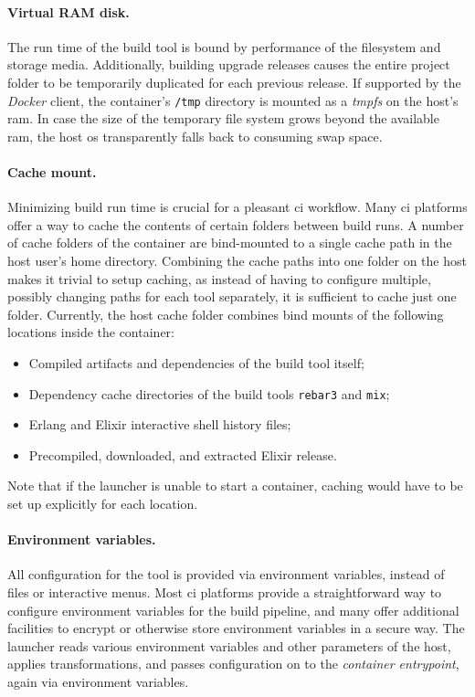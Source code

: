 \paragraph{Virtual RAM disk.} The run time of the build tool is bound by performance of the filesystem and storage media. Additionally, building upgrade releases causes the entire project folder to be temporarily duplicated for each previous release.
If supported by the \emph{Docker} client, the container's \lstinline|/tmp| directory is mounted as a \emph{\acrfull{tmpfs}} on the host's \acrshort{ram}. In case the size of the temporary file system grows beyond the available \acrshort{ram}, the host \acrshort{os} transparently falls back to consuming swap space.


\paragraph{Cache mount.} Minimizing build run time is crucial for a pleasant \acrlong{ci} workflow. Many \acrshort{ci} platforms offer a way to cache the contents of certain folders between build runs. A number of cache folders of the container are bind-mounted to a single cache path in the host user's home directory. Combining the cache paths into one folder on the host makes it trivial to setup caching, as instead of having to configure multiple, possibly changing paths for each tool separately, it is sufficient to cache just one folder. Currently, the host cache folder combines bind mounts of the following locations inside the container:
\begin{itemize}
  \item Compiled artifacts and dependencies of the build tool itself;
  \item Dependency cache directories of the build tools \lstinline|rebar3| and \lstinline|mix|;
  \item Erlang and Elixir interactive shell history files;
  \item Precompiled, downloaded, and extracted Elixir release.
\end{itemize}
Note that if the launcher is unable to start a container, caching would have to be set up explicitly for each location.

\paragraph{Environment variables.} All configuration for the tool is provided via environment variables, instead of files or interactive menus. Most \acrlong{ci} platforms provide a straightforward way to configure environment variables for the build pipeline, and many offer additional facilities to encrypt or otherwise store environment variables in a secure way. The launcher reads various environment variables and other parameters of the host, applies transformations, and passes configuration on to the \emph{container entrypoint}, again via environment variables.

